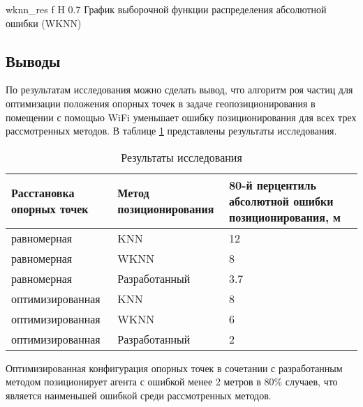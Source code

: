     {wknn_res}
    {f}
    {H}
    {0.7\linewidth}
    {График выборочной функции распределения абсолютной ошибки (WKNN)}

\subsection{Выводы}


По результатам исследования можно сделать вывод, что алгоритм роя частиц для оптимизации положения опорных точек в задаче геопозиционирования в помещении с помощью WiFi уменьшает ошибку позиционирования для всех трех рассмотренных методов. В таблице \ref{tab:finres} представлены результаты исследования.

\begin{table}[H]
    \centering
    \caption{Результаты исследования}
    \label{tab:finres}
    \begin{tabular}{|m{5cm}|m{5cm}|m{5cm}|}
        \hline
        Расстановка опорных точек & Метод позиционирования & 80-й перцентиль абсолютной ошибки позиционирования, м \\
        \hline
        равномерная & KNN & 12 \\
        \hline
        равномерная & WKNN & 8 \\
        \hline
        равномерная & Разработанный & 3.7 \\
        \hline
        оптимизированная & KNN & 8 \\
        \hline
        оптимизированная & WKNN & 6 \\
        \hline
        оптимизированная & Разработанный & 2 \\
        \hline
    \end{tabular}
\end{table}

Оптимизированная конфигурация опорных точек в сочетании с разработанным методом позиционирует агента с ошибкой менее 2 метров в 80\% случаев, что является наименьшей ошибкой среди рассмотренных методов.
